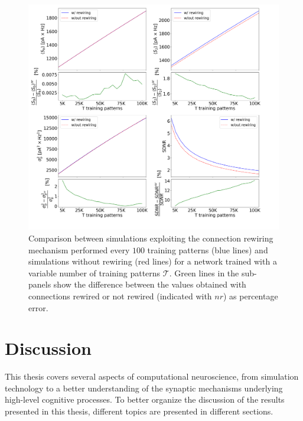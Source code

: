 \documentclass[a4paper, 12pt, twoside, openright]{book}
\newcommand{\T}{\mathcal{T}}
\begin{document}
\begin{figure}[t]
    \centering
	\includegraphics[width=\columnwidth]{figures/no_rewiring.png}
	\caption{ 
    Comparison between simulations exploiting the
    connection rewiring mechanism performed every $100$ training patterns (blue lines) and simulations without rewiring (red lines) for a network trained with a variable number of training patterns $\T$. Green lines in the sub-panels show the difference between the values obtained with connections rewired or not rewired (indicated with $nr$) as percentage error.
	\label{fig:rew_vs_norew}}
\end{figure}



\fancyfoot[C]{\thepage}

\part*{Discussion}

This thesis covers several aspects of computational neuroscience, from simulation technology to a better understanding of the synaptic mechanisms underlying high-level cognitive processes. To better organize the discussion of the results presented in this thesis, different topics are presented in different sections.
\end{document}

